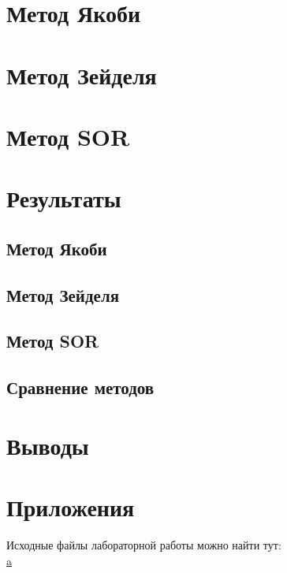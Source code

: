 \documentclass[12pt]{article}
\begin{document}
\section{Метод Якоби}
\section{Метод Зейделя}
\section{Метод SOR}
\section{Результаты}
\subsection{Метод Якоби}
\subsection{Метод Зейделя}
\subsection{Метод SOR}
\subsection{Сравнение методов}
\section{Выводы}
\section{Приложения}
Исходные файлы лабораторной работы можно найти тут: \\
\url{a}
\end{document}
